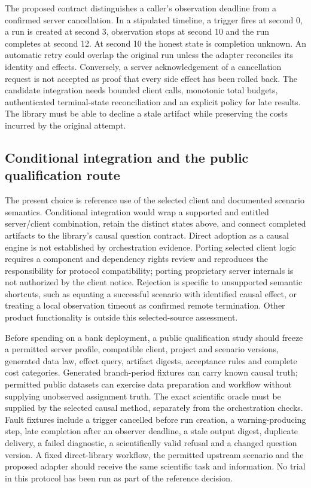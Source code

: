 The proposed contract distinguishes a caller's observation deadline from a
confirmed server cancellation. In a stipulated timeline, a trigger fires at
second 0, a run is created at second 3, observation stops at second 10 and the
run completes at second 12. At second 10 the honest state is completion
unknown. An automatic retry could overlap the original run unless the adapter
reconciles its identity and effects. Conversely, a server acknowledgement of
a cancellation request is not accepted as proof that every side effect has
been rolled back. The candidate integration needs bounded client calls,
monotonic total budgets, authenticated terminal-state reconciliation and an
explicit policy for late results. The library must be able to decline a stale
artifact while preserving the costs incurred by the original attempt.\citep{exec25_dataiku_choice}

\subsection{Conditional integration and the public qualification route}
The present choice is reference use of the selected client and documented
scenario semantics. Conditional integration would wrap a supported and
entitled server/client combination, retain the distinct states above, and
connect completed artifacts to the library's causal question contract. Direct
adoption as a causal engine is not established by orchestration evidence.
Porting selected client logic requires a component and dependency rights
review and reproduces the responsibility for protocol compatibility; porting
proprietary server internals is not authorized by the client notice. Rejection
is specific to unsupported semantic shortcuts, such as equating a successful
scenario with identified causal effect, or treating a local observation timeout
as confirmed remote termination. Other product functionality is outside this
selected-source assessment.\citep{exec24_workflow_contracts_dataiku,exec25_dataiku_choice}

Before spending on a bank deployment, a public qualification study should
freeze a permitted server profile, compatible client, project and scenario
versions, generated data law, effect query, artifact digests, acceptance rules
and complete cost categories. Generated branch-period fixtures can carry known
causal truth; permitted public datasets can exercise data preparation and
workflow without supplying unobserved assignment truth. The exact scientific
oracle must be supplied by the selected causal method, separately from the
orchestration checks. Fault fixtures include a trigger cancelled before run
creation, a warning-producing step, late completion after an observer deadline,
a stale output digest, duplicate delivery, a failed diagnostic, a scientifically
valid refusal and a changed question version. A fixed direct-library workflow,
the permitted upstream scenario and the proposed adapter should receive the
same scientific task and information. No trial in this protocol has been run
as part of the reference decision.\citep{exec25_dataiku_choice}

